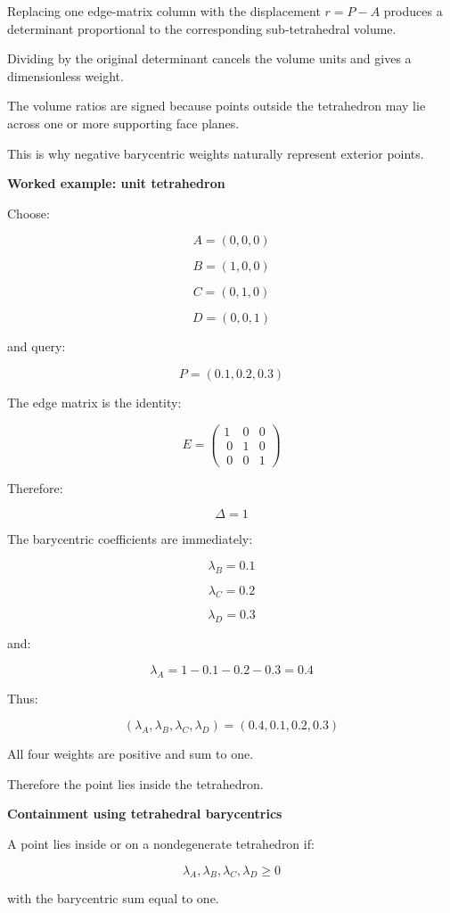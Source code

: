 Replacing one edge-matrix column with the displacement \(r=P-A\) produces a determinant proportional to the corresponding sub-tetrahedral volume.

Dividing by the original determinant cancels the volume units and gives a dimensionless weight.

The volume ratios are signed because points outside the tetrahedron may lie across one or more supporting face planes.

This is why negative barycentric weights naturally represent exterior points.

\textbf{Worked example: unit tetrahedron}

Choose:

\[
A=(0,0,0)
\]

\[
B=(1,0,0)
\]

\[
C=(0,1,0)
\]

\[
D=(0,0,1)
\]

and query:

\[
P=(0.1,0.2,0.3)
\]

The edge matrix is the identity:

\[
E= \begin{pmatrix} 1&0&0\\\ 0&1&0\\\ 0&0&1 \end{pmatrix}
\]

Therefore:

\[
\Delta=1
\]

The barycentric coefficients are immediately:

\[
\lambda_B=0.1
\]

\[
\lambda_C=0.2
\]

\[
\lambda_D=0.3
\]

and:

\[
\lambda_A=1-0.1-0.2-0.3=0.4
\]

Thus:

\[
\boxed{ (\lambda_A,\lambda_B,\lambda_C,\lambda_D) =(0.4,0.1,0.2,0.3) }
\]

All four weights are positive and sum to one.

Therefore the point lies inside the tetrahedron.

\textbf{Containment using tetrahedral barycentrics}

A point lies inside or on a nondegenerate tetrahedron if:

\[
\boxed{ \lambda_A,\lambda_B,\lambda_C,\lambda_D\ge0 }
\]

with the barycentric sum equal to one.

